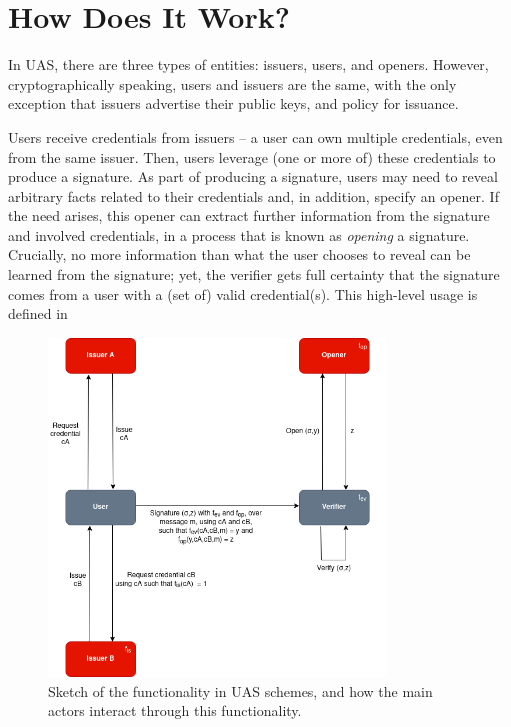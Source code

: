 \section{How Does It Work?}
\label{sec:functionality}

In UAS, there are three types of entities: issuers, users, and openers. However,
cryptographically speaking, users and issuers are the same, with the only
exception that issuers advertise their public keys, and policy for issuance.

Users receive credentials from issuers -- a user can own multiple credentials,
even from the same issuer. Then, users leverage (one or more of) these
credentials to produce a signature. As part of producing a signature, users
may need to reveal arbitrary facts related to their credentials and, in
addition, specify an opener. If the need arises, this opener can extract further
information from the signature and involved credentials, in a process that is
known as \emph{opening} a signature. Crucially, no more information than what
the user chooses to reveal can be learned from the signature; yet, the verifier
gets full certainty that the signature comes from a user with a (set of) valid
credential(s). This high-level usage is defined in 

\begin{figure}[ht!]
  \centering
  \includegraphics[width=0.8\textwidth]{figures/uas-functionality.png}
  \caption{Sketch of the functionality in UAS schemes, and how the main actors
    interact through this functionality.}
  \label{fig:functionality}
\end{figure}

